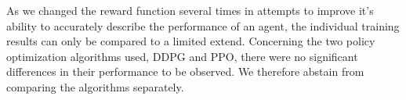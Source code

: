 As we changed the reward function several times in attempts to improve it's ability to accurately describe the performance of an agent, the individual training results can only be compared to a limited extend.
Concerning the two policy optimization algorithms used, DDPG and PPO, there were no significant differences in their performance to be observed.
We therefore abstain from comparing the algorithms separately.




